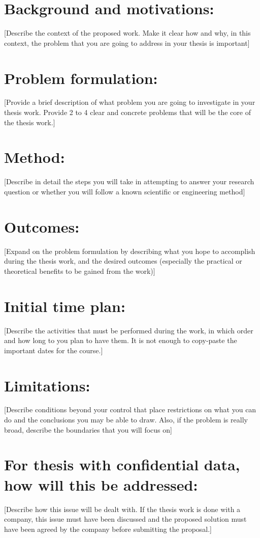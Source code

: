 \section*{Background and motivations:}
\alert{[Describe the context of the proposed work. Make it clear how and why, in this context, the problem that you are going to address in your thesis is important]} \cite{Berndtsson607210}


\section*{Problem formulation:}
\alert{[Provide a brief description of what problem you are going to investigate in your thesis work. Provide 2 to 4 clear and concrete problems that will be the core of the thesis work.]}


\section*{Method:}
\alert{[Describe in detail the steps you will take in attempting to answer your research question or whether you will follow a known scientific or engineering method]}

\section*{Outcomes:}
\alert{[Expand on the problem formulation by describing what you hope to accomplish during the thesis work, and the desired outcomes (especially the practical or theoretical benefits to be gained from the work)]}

\section*{Initial time plan:}
\alert{[Describe the activities that must be performed during the work, in which order and how long to you plan to have them. It is not enough to copy-paste the important dates for the course.]}

\section*{Limitations:}
\alert{[Describe conditions beyond your control that place restrictions on what you can do and the conclusions you may be able to draw. Also, if the problem is really broad, describe the boundaries that you will focus on]}

\section*{For thesis with confidential data, how will this be addressed:}
\alert{[Describe how this issue will be dealt with. If the thesis work is done with a company, this issue must have been discussed and the proposed solution must have been agreed by the company before submitting the proposal.]} 
\vspace{1cm}

